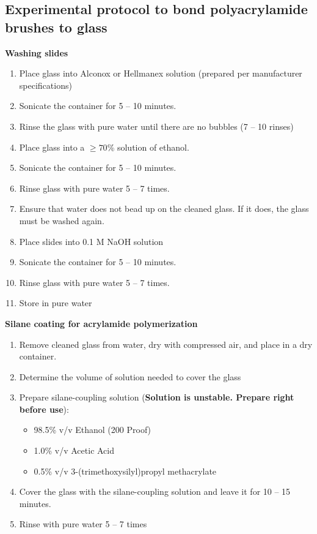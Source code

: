 \begin{appendices}
\chapter{Experimental protocol to bond polyacrylamide brushes to glass}\label{a:B}
{\bf Washing slides}
\begin{enumerate}
  \item Place glass into Alconox or Hellmanex solution (prepared per manufacturer specifications)
  \item Sonicate the container for 5 -- 10 minutes.
  \item Rinse the glass with pure water until there are no bubbles (7 -- 10 rinses)
  \item Place glass into a $\geq 70$\% solution of ethanol.
  \item Sonicate the container for 5 -- 10 minutes.
  \item Rinse glass with pure water 5 -- 7 times.
  \item Ensure that water does not bead up on the cleaned glass. If it does, the glass must be washed again.
  \item Place slides into 0.1 M NaOH solution
  \item Sonicate the container for 5 -- 10 minutes.
  \item Rinse glass with pure water 5 -- 7 times.
  \item Store in pure water
\end{enumerate}
{\bf Silane coating for acrylamide polymerization}
\begin{enumerate}
  \item Remove cleaned glass from water, dry with compressed air, and place in a dry container.
  \item Determine the volume of solution needed to cover the glass
  \item Prepare silane-coupling solution ({\bf Solution is unstable. Prepare right before use}):
  \begin{itemize}
    \item 98.5\% v/v Ethanol (200 Proof)
    \item 1.0\% v/v Acetic Acid
    \item 0.5\% v/v 3-(trimethoxysilyl)propyl methacrylate
  \end{itemize}
  \item Cover the glass with the silane-coupling solution and leave it for 10 -- 15 minutes.
  \item Rinse with pure water 5 -- 7 times
\end{enumerate}

\end{appendices}
